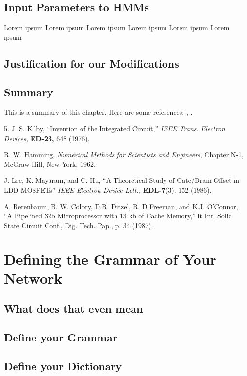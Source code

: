 \documentclass{wileySev}
\begin{document}
\section{Input Parameters to HMMs} 
Lorem ipsum Lorem ipsum Lorem ipsum Lorem ipsum Lorem ipsum Lorem ipsum

\section{Justification for our Modifications}

\section{Summary}
This is a summary of this chapter.
Here are some references: \cite{xkilby}, \cite{xberen}.

\begin{chapreferences}{5.}
J. S. Kilby,
``Invention of the Integrated Circuit,'' {\it IEEE Trans. Electron Devices,}
{\bf ED-23,} 648 (1976).


R. W. Hamming,
                 {\it Numerical Methods for Scientists and 
                 Engineers}, Chapter N-1, McGraw-Hill, 
                 New York, 1962.

J. Lee, K. Mayaram, and C. Hu, ``A Theoretical
               Study of Gate/Drain Offset in LDD MOSFETs''
                     {\it IEEE Electron Device Lett.,} {\bf EDL-7}(3). 152 
                     (1986).

A. Berenbaum, 
B. W. Colbry, D.R. Ditzel, R. D Freeman, and 
K.J. O'Connor, ``A Pipelined 32b Microprocessor with 13 kb of Cache Memory,''
{it Int. Solid State Circuit Conf., Dig. Tech. Pap.,} p. 34 (1987).
\end{chapreferences}

\chapter{Defining the Grammar of Your Network}
\section{What does that even mean}
\section{Define your Grammar}
\section{Define your Dictionary}
\end{document}
